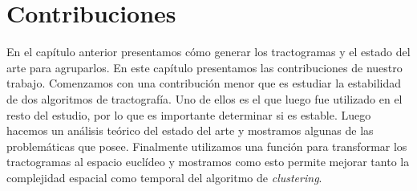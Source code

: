 \chapter{Contribuciones}

En el cap\'itulo anterior presentamos c\'omo generar los tractogramas y el 
estado del arte para agruparlos. En este cap\'itulo presentamos las contribuciones
de nuestro trabajo. Comenzamos con una contribuci\'on menor que es estudiar la 
estabilidad de dos algoritmos de tractograf\'ia. Uno de ellos es el que luego 
fue utilizado en el resto del estudio, por lo que es importante determinar si es
estable. Luego hacemos un an\'alisis te\'orico del estado del arte y mostramos
algunas de las problem\'aticas que posee. Finalmente utilizamos una funci\'on 
para transformar los tractogramas al espacio eucl\'ideo y mostramos como esto
permite mejorar tanto la complejidad espacial como temporal del algoritmo de 
\textit{clustering}. \\










